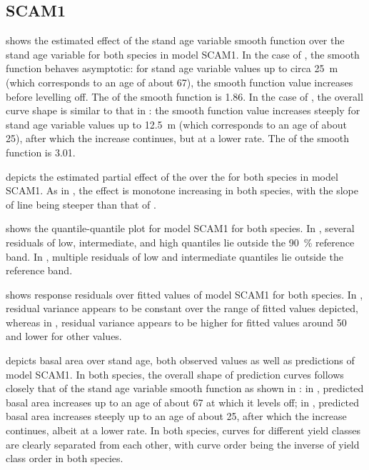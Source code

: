 \subsection{SCAM1}

 shows the estimated effect of the stand age variable smooth function over the stand age variable for both species in model SCAM1.  In the case of \Beech{}, the smooth function behaves asymptotic:  for stand age variable values up to circa \SI{25}{\meter} (which corresponds to an age of about \SI{67}{\year}), the smooth function value increases before levelling off.  The \edf{} of the smooth function is \num{1.86}.  In the case of \Spruce{}, the overall curve shape is similar to that in :  the smooth function value increases steeply for stand age variable values up to \SI{12.5}{\meter} (which corresponds to an age of about \SI{25}{\year}), after which the increase continues, but at a lower rate.  The \edf{} of the smooth function is \num{3.01}.

 depicts the estimated partial effect of the \ProductivityIndexVariableText{} over the \ProductivityIndexVariableText{} for both species in model SCAM1.  As in , the effect is monotone increasing in both species, with the slope of \Beech{} line being steeper than that of \Spruce{}.

 shows the quantile-quantile plot for model SCAM1 for both species.  In \Beech{}, several residuals of low, intermediate, and high quantiles lie outside the \SI{90}{\percent} reference band.  In \Spruce{}, multiple residuals of low and intermediate quantiles lie outside the reference band.

 shows response residuals over fitted values of model SCAM1 for both species.  In \Beech{}, residual variance appears to be constant over the range of fitted values depicted, whereas in \Spruce{}, residual variance appears to be higher for fitted values around \num{50} and lower for other values.

 depicts basal area over stand age, both observed values as well as predictions of model SCAM1.  In both species, the overall shape of prediction curves follows closely that of the stand age variable smooth function as shown in :  in \Beech{}, predicted basal area increases up to an age of about \SI{67}{\year} at which it levels off;  in \Spruce{}, predicted basal area increases steeply up to an age of about \SI{25}{\year}, after which the increase continues, albeit at a lower rate.  In both species, curves for different yield classes are clearly separated from each other, with curve order being the inverse of yield class order in both species.

